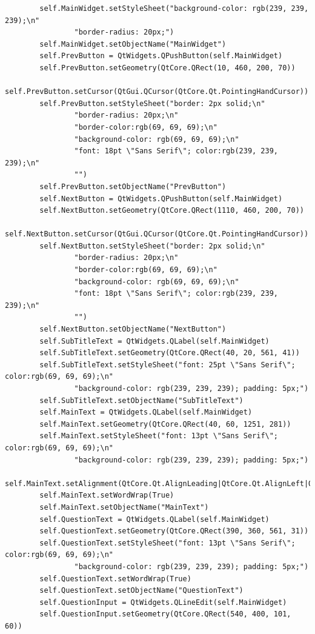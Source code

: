 \documentclass{article}
\begin{document}
\begin{lstlisting}
        self.MainWidget.setStyleSheet("background-color: rgb(239, 239, 239);\n"
                "border-radius: 20px;")
        self.MainWidget.setObjectName("MainWidget")
        self.PrevButton = QtWidgets.QPushButton(self.MainWidget)
        self.PrevButton.setGeometry(QtCore.QRect(10, 460, 200, 70))
        self.PrevButton.setCursor(QtGui.QCursor(QtCore.Qt.PointingHandCursor))
        self.PrevButton.setStyleSheet("border: 2px solid;\n"
                "border-radius: 20px;\n"
                "border-color:rgb(69, 69, 69);\n"
                "background-color: rgb(69, 69, 69);\n"
                "font: 18pt \"Sans Serif\"; color:rgb(239, 239, 239);\n"
                "")
        self.PrevButton.setObjectName("PrevButton")
        self.NextButton = QtWidgets.QPushButton(self.MainWidget)
        self.NextButton.setGeometry(QtCore.QRect(1110, 460, 200, 70))
        self.NextButton.setCursor(QtGui.QCursor(QtCore.Qt.PointingHandCursor))
        self.NextButton.setStyleSheet("border: 2px solid;\n"
                "border-radius: 20px;\n"
                "border-color:rgb(69, 69, 69);\n"
                "background-color: rgb(69, 69, 69);\n"
                "font: 18pt \"Sans Serif\"; color:rgb(239, 239, 239);\n"
                "")
        self.NextButton.setObjectName("NextButton")
        self.SubTitleText = QtWidgets.QLabel(self.MainWidget)
        self.SubTitleText.setGeometry(QtCore.QRect(40, 20, 561, 41))
        self.SubTitleText.setStyleSheet("font: 25pt \"Sans Serif\"; color:rgb(69, 69, 69);\n"
                "background-color: rgb(239, 239, 239); padding: 5px;")
        self.SubTitleText.setObjectName("SubTitleText")
        self.MainText = QtWidgets.QLabel(self.MainWidget)
        self.MainText.setGeometry(QtCore.QRect(40, 60, 1251, 281))
        self.MainText.setStyleSheet("font: 13pt \"Sans Serif\"; color:rgb(69, 69, 69);\n"
                "background-color: rgb(239, 239, 239); padding: 5px;")
        self.MainText.setAlignment(QtCore.Qt.AlignLeading|QtCore.Qt.AlignLeft|QtCore.Qt.AlignTop)
        self.MainText.setWordWrap(True)
        self.MainText.setObjectName("MainText")
        self.QuestionText = QtWidgets.QLabel(self.MainWidget)
        self.QuestionText.setGeometry(QtCore.QRect(390, 360, 561, 31))
        self.QuestionText.setStyleSheet("font: 13pt \"Sans Serif\"; color:rgb(69, 69, 69);\n"
                "background-color: rgb(239, 239, 239); padding: 5px;")
        self.QuestionText.setWordWrap(True)
        self.QuestionText.setObjectName("QuestionText")
        self.QuestionInput = QtWidgets.QLineEdit(self.MainWidget)
        self.QuestionInput.setGeometry(QtCore.QRect(540, 400, 101, 60))

\end{lstlisting}
\end{document}
